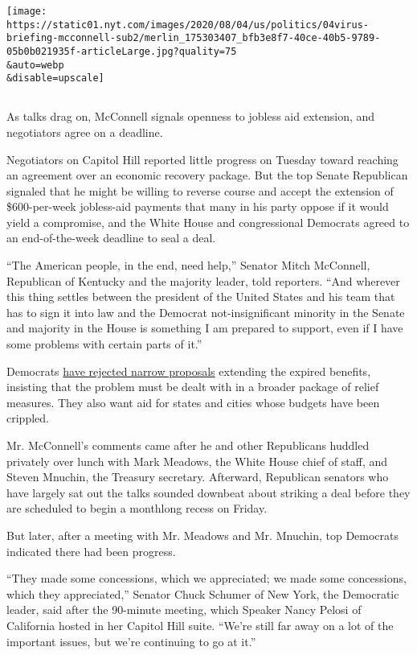 \texttt{[image: https://static01.nyt.com/images/2020/08/04/us/politics/04virus-briefing-mcconnell-sub2/merlin\_175303407\_bfb3e8f7-40ce-40b5-9789-05b0b021935f-articleLarge.jpg?quality=75\\\&auto=webp\\\&disable=upscale]}

\subsection{}

As talks drag on, McConnell signals openness to jobless aid extension,
and negotiators agree on a deadline.

Negotiators on Capitol Hill reported little progress on Tuesday toward
reaching an agreement over an economic recovery package. But the top
Senate Republican signaled that he might be willing to reverse course
and accept the extension of \$600-per-week jobless-aid payments that
many in his party oppose if it would yield a compromise, and the White
House and congressional Democrats agreed to an end-of-the-week deadline
to seal a deal.

``The American people, in the end, need help,'' Senator Mitch McConnell,
Republican of Kentucky and the majority leader, told reporters. ``And
wherever this thing settles between the president of the United States
and his team that has to sign it into law and the Democrat
not-insignificant minority in the Senate and majority in the House is
something I am prepared to support, even if I have some problems with
certain parts of it.''

Democrats
\href{https://www.nytimes.com/2020/08/02/us/politics/coronavirus-jobless-aid.html}{have
rejected narrow proposals} extending the expired benefits, insisting
that the problem must be dealt with in a broader package of relief
measures. They also want aid for states and cities whose budgets have
been crippled.

Mr. McConnell's comments came after he and other Republicans huddled
privately over lunch with Mark Meadows, the White House chief of staff,
and Steven Mnuchin, the Treasury secretary. Afterward, Republican
senators who have largely sat out the talks sounded downbeat about
striking a deal before they are scheduled to begin a monthlong recess on
Friday.

But later, after a meeting with Mr. Meadows and Mr. Mnuchin, top
Democrats indicated there had been progress.

``They made some concessions, which we appreciated; we made some
concessions, which they appreciated,'' Senator Chuck Schumer of New
York, the Democratic leader, said after the 90-minute meeting, which
Speaker Nancy Pelosi of California hosted in her Capitol Hill suite.
``We're still far away on a lot of the important issues, but we're
continuing to go at it.''

